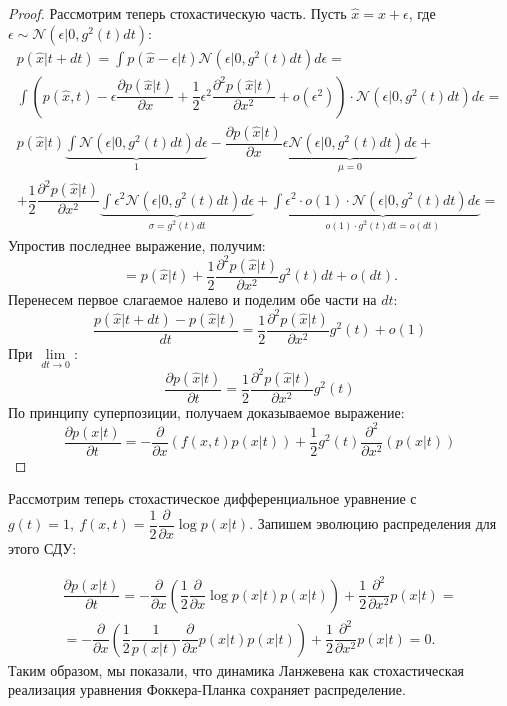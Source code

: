 \begin{proof}
    Рассмотрим теперь стохастическую часть. Пусть $\hat{x} = x + \epsilon$, где $\epsilon \sim \mathcal{N}(\epsilon| 0, g^2(t) dt)$:
    \[
        \begin{array}{c}
        \displaystyle p(\hat{x} | t+dt) = \int p(\hat{x} - \epsilon| t) \mathcal{N}(\epsilon | 0, g^2(t)dt) d\epsilon = \\[0.5cm]
        \displaystyle \int \left(p(\hat{x}, t) - \epsilon \dfrac{\partial p(\hat{x} | t)}{\partial x} + \dfrac{1}{2} \epsilon^2 \dfrac{\partial^2 p(\hat{x} |t)}{\partial x^2} + o(\epsilon^2)\right) \cdot \mathcal{N}(\epsilon| 0, g^2(t)dt)d\epsilon = \\[0.5cm]
        \displaystyle p(\hat{x} | t) \underbrace{\int \mathcal{N}(\epsilon| 0, g^2(t)dt)d\epsilon}_{1} - \dfrac{\partial p(\hat{x} | t)}{\partial x} \underbrace{\epsilon\mathcal{N}(\epsilon| 0, g^2(t)dt)d\epsilon}_{\mu = 0} + \\[0.5cm] 
        \displaystyle + \dfrac{1}{2} \dfrac{\partial^2 p(\hat{x} | t)}{\partial x^2} \underbrace{\int \epsilon^2 \mathcal{N}(\epsilon| 0, g^2(t)dt) d\epsilon}_{\sigma = g^2(t) dt} + \int \underbrace{\epsilon^2 \cdot o(1) \cdot \mathcal{N}(\epsilon| 0, g^2(t)dt) d\epsilon}_{o(1) \cdot g^2(t) dt = o(dt)} =
        \end{array}
    \]
    Упростив последнее выражение, получим:
    \[
        = p(\hat{x}|t) + \dfrac{1}{2} \dfrac{\partial^2 p(\hat{x} |t)}{\partial x^2} g^2(t) dt + o(dt).
    \]
    Перенесем первое слагаемое налево и поделим обе части на $dt$:
    \[
        \dfrac{p(\hat{x} | t + dt) - p(\hat{x} | t)}{dt} = \dfrac{1}{2}\dfrac{\partial^2 p(\hat{x} | t)}{\partial x^2} g^2(t) + o(1)
    \]
    При $\lim\limits_{dt \to 0}$:
    \[
       \dfrac{\partial p(\hat{x} | t)}{\partial t} = \dfrac{1}{2} \dfrac{\partial^2 p(\hat{x} | t)}{\partial x^2} g^2(t)
    \]
    По принципу суперпозиции, получаем доказываемое выражение: 
    \[
        \dfrac{\partial p(x|t)}{\partial t} = -\dfrac{\partial }{\partial x} \left(f\left(x,t\right)p(x|t) \right) + \dfrac{1}{2}g^2 (t) \dfrac{\partial^2}{\partial x^2} \left(p(x|t)\right)
    \]
\end{proof}

Рассмотрим теперь стохастическое дифференциальное уравнение с $g(t) = 1,\ f(x, t) = \dfrac{1}{2} \dfrac{\partial }{\partial x} \log p(x| t)$. Запишем эволюцию распределения для этого СДУ:

\[
    \begin{array}{c}
        \dfrac{\partial p(x| t)}{\partial t} = -\dfrac{\partial}{\partial x} \left(\dfrac{1}{2} \dfrac{\partial }{\partial x} \log p(x | t) p(x|t)\right) + \dfrac{1}{2} \dfrac{\partial^2}{\partial x^2} p(x | t) = \\[0.5cm] 
        = -\dfrac{\partial }{\partial x} \left(\dfrac{1}{2} \dfrac{1}{p(x|t)} \dfrac{\partial}{\partial x} p(x|t) p(x|t)\right) + \dfrac{1}{2} \dfrac{\partial^2}{\partial x^2} p(x|t) = 0.
    \end{array}
\]
Таким образом, мы показали, что динамика Ланжевена как стохастическая реализация уравнения Фоккера-Планка сохраняет распределение.

